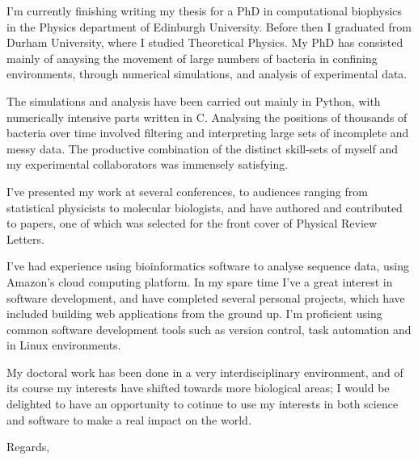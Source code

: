 \documentclass[10pt]{letter}
\begin{document}
    \begin{letter}{}

        I'm currently finishing writing my thesis for a PhD in computational biophysics in the Physics department of Edinburgh University. Before then I graduated from Durham University, where I studied Theoretical Physics. My PhD has consisted mainly of anaysing the movement of large numbers of bacteria in confining environments, through numerical simulations, and analysis of experimental data.

        The simulations and analysis have been carried out mainly in Python, with numerically intensive parts written in C. Analysing the positions of thousands of bacteria over time involved filtering and interpreting large sets of incomplete and messy data. The productive combination of the distinct skill-sets of myself and my experimental collaborators was immensely satisfying.

        I've presented my work at several conferences, to audiences ranging from statistical physicists to molecular biologists, and have authored and contributed to papers, one of which was selected for the front cover of Physical Review Letters.

        I've had experience using bioinformatics software to analyse sequence data, using Amazon's cloud computing platform. In my spare time I've a great interest in software development, and have completed several personal projects, which have included building web applications from the ground up. I'm proficient using common software development tools such as version control, task automation and in Linux environments.

        My doctoral work has been done in a very interdisciplinary environment, and of its course my interests have shifted towards more biological areas; I would be delighted to have an opportunity to cotinue to use my interests in both science and software to make a real impact on the world.

        \closing{Regards,}

    \end{letter}        
\end{document}
